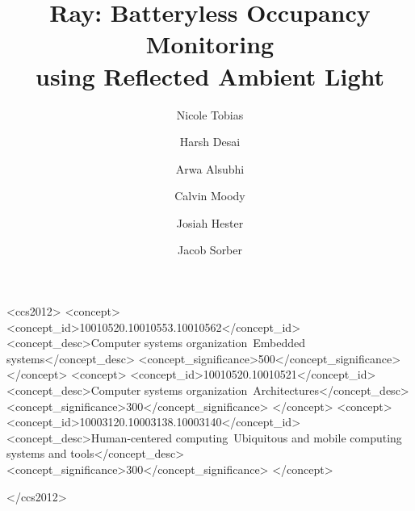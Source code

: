 \documentclass[sigconf, anonymous=true, 9pt]{acmart}
\newcommand{\sysnameraw}{Ray}
\newcommand{\sysname}{\sysnameraw\xspace}
\begin{document}


\title[Batteryless Occupancy Monitoring with \sysname]{\sysname: Batteryless Occupancy Monitoring \\using Reflected Ambient Light}


\author{Nicole Tobias}

\author{Harsh Desai}

\author{Arwa Alsubhi}

\author{Calvin Moody}

\author{Josiah Hester}

\author{Jacob Sorber}

\renewcommand{\shortauthors}{N. Tobias et al.}


\begin{abstract}

\end{abstract}

\ifsubmit

\begin{CCSXML}
<ccs2012>
<concept>
<concept_id>10010520.10010553.10010562</concept_id>
<concept_desc>Computer systems organization~Embedded systems</concept_desc>
<concept_significance>500</concept_significance>
</concept>
<concept>
<concept_id>10010520.10010521</concept_id>
<concept_desc>Computer systems organization~Architectures</concept_desc>
<concept_significance>300</concept_significance>
</concept>
<concept>
<concept_id>10003120.10003138.10003140</concept_id>
<concept_desc>Human-centered computing~Ubiquitous and mobile computing systems and tools</concept_desc>
<concept_significance>300</concept_significance>
</concept>

</ccs2012>
\end{CCSXML}
\end{document}
